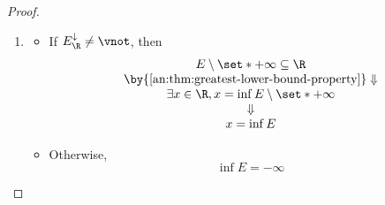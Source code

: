\begin{proof}
\begin{itemize}
\begin{enumerate}[label=\textbf{(\Alph*)}]
\begin{itemize}
\[                          \]
                  \end{itemize}
            \item \begin{itemize}
                    \item If $E_{\R}^{\downarrow} \neq \vnot$, then
                          \[
                            \begin{array}{c}
                              E \setminus \set*{+ \infty} \subseteq \R                    \\
                              \by{\Cref{an:thm:greatest-lower-bound-property}} \Downarrow \\
                              \exists x \in \R, x = \inf E \setminus \set*{+ \infty}      \\
                              \Downarrow                                                  \\
                              x = \inf E
                            \end{array}
                          \]
                    \item Otherwise,
                          \[
                            \inf E = - \infty
                          \]
                  \end{itemize}
          \end{enumerate}
  \end{itemize}
\end{proof}
